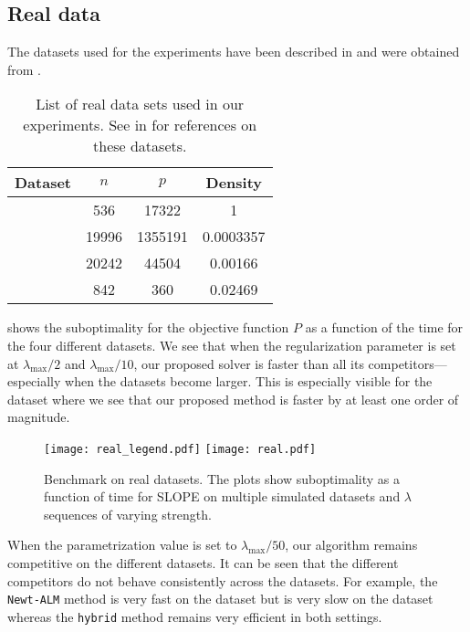 \subsection{Real data}
\label{sec:experiments-real-data}



The datasets used for the experiments have been described in  and were obtained from \textcite{chang2011,chang2016,breheny2022}.

\begin{table}[hbt]
  \centering
  \caption{%
    List of real data sets used in our experiments.
    See  in  for references on these datasets.
  }
  \label{tab:real-data}
  \begin{tabular}{
      l
      S[table-format=5.0,round-mode=off]
      S[table-format=7.0,round-mode=off]
      S[table-format=1.5,round-mode=figures,round-precision=2]
    }
    \toprule
    Dataset            & {\(n\)} & {\(p\)} & {Density} \\ \midrule
       & 536     & 17322   & 1         \\
       & 19996   & 1355191 & 0.0003357 \\
         & 20242   & 44504   & 0.00166   \\
     & 842     & 360     & 0.02469   \\ \bottomrule
  \end{tabular}
\end{table}

 shows the suboptimality for the objective function $P$ as a function of the time for the four different datasets.
We see that when the regularization parameter is set at $\lambda_{\text{max}}/2$ and $\lambda_{\text{max}}/10$, our proposed solver is faster than all its competitors---especially when the datasets become larger.
This is especially visible for the  dataset where we see that our proposed method is faster by at least one order of magnitude.

\begin{figure*}[!t]
  \centering
  \texttt{[image: real\_legend.pdf]}
  \texttt{[image: real.pdf]}
  \caption{Benchmark on real datasets. The plots show suboptimality as a function of time for SLOPE on multiple simulated datasets and $\lambda$ sequences of varying strength.}
  \label{fig:real-data}
\end{figure*}



When the parametrization value is set to $\lambda_{\text{max}}/50$, our algorithm remains competitive on the different datasets.
It can be seen that the different competitors do not behave consistently across the datasets.
For example, the \texttt{Newt-ALM} method is very fast on the  dataset but is very slow on the  dataset whereas the \texttt{hybrid} method remains very efficient in both settings.
